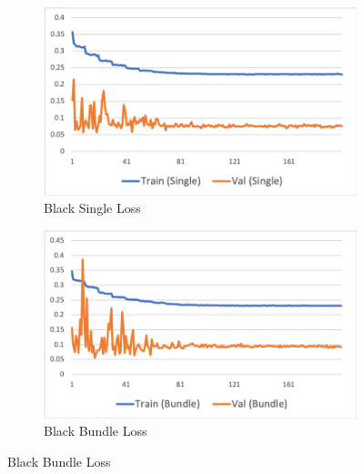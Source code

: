 \documentclass[10pt,twocolumn,letterpaper]{article}
\begin{document}
\begin{figure}[h!]
   \begin{subfigure}{0.25\textwidth}
      \centering
      \includegraphics[width=\linewidth]{fig/cnn_black_single.png}
      \caption{Black Single Loss} \label{fig:k}
    \end{subfigure}\hspace*{\fill}
    \begin{subfigure}{0.25\textwidth}
      \centering
      \includegraphics[width=\linewidth]{fig/cnn_black_bundle.png}
      \caption{Black Bundle Loss} \label{fig:k}
    \end{subfigure}\hspace*{\fill}
    \newline \newline
    

\end{figure}
\end{document}
